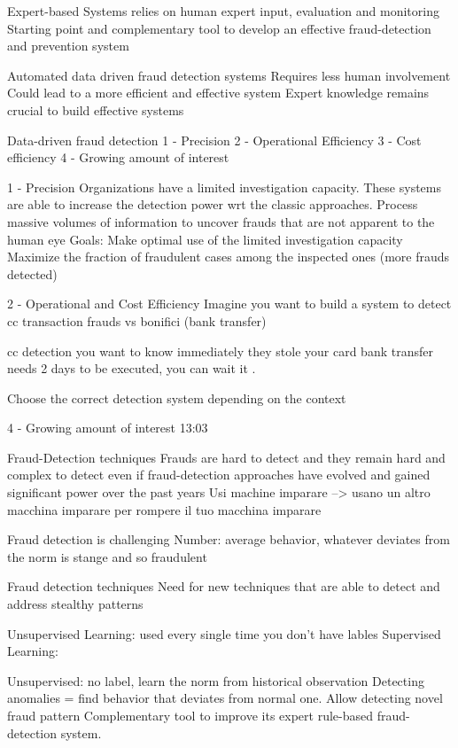 Expert-based Systems
    relies on human expert input, evaluation and monitoring 
    Starting point and complementary tool to develop an effective fraud-detection and prevention system

    Automated data driven fraud detection systems 
        Requires less human involvement 
        Could lead to a more efficient and effective system 
        Expert knowledge remains crucial to build effective systems 

Data-driven fraud detection 
    1 - Precision
    2 - Operational Efficiency 
    3 - Cost efficiency 
    4 - Growing amount of interest 

    1 - Precision 
        Organizations have a limited investigation capacity. These systems are able to increase the detection power wrt the classic approaches.
        Process massive volumes of information to uncover frauds that are not apparent to the human eye 
        Goals:
            Make optimal use of the limited investigation capacity 
            Maximize the fraction of fraudulent cases among the inspected ones (more frauds detected)
    
    2 - Operational and Cost Efficiency
        Imagine you want to build a system to detect cc transaction frauds vs bonifici (bank transfer)

        cc detection you want to know immediately they stole your card 
        bank transfer needs 2 days to be executed, you can wait it .

        Choose the correct detection system depending on the context

    4 - Growing amount of interest 
        13:03

Fraud-Detection techniques
    Frauds are hard to detect 
        and they remain hard and complex to detect even if fraud-detection approaches have evolved and gained significant power over the past years 
        Usi machine imparare --> usano un altro macchina imparare per rompere il tuo macchina imparare

Fraud detection is challenging
    Number: average behavior, whatever deviates from the norm is stange and so fraudulent 

Fraud detection techniques
    Need for new techniques that are able to detect and
    address stealthy patterns

    Unsupervised Learning: used every single time you don't have lables 
    Supervised Learning: 

Unsupervised:
    no label, learn the norm from historical observation
    Detecting anomalies = find behavior that deviates from normal one.
    Allow detecting novel fraud pattern 
    Complementary tool to improve its expert rule-based fraud-detection system.

